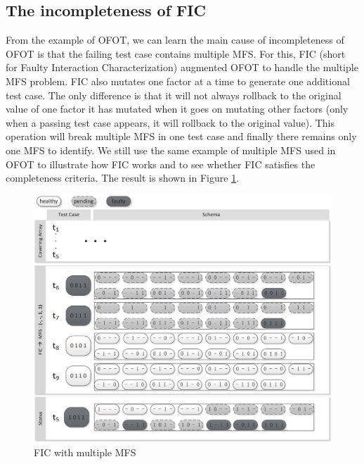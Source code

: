 \subsection{The incompleteness of FIC}

From the example of OFOT, we can learn the main cause of incompleteness of OFOT is that the failing test case contains multiple MFS. For this, FIC \cite{zhang2011characterizing} (short for Faulty Interaction Characterization) augmented OFOT to handle the multiple MFS problem.
FIC also mutates one factor at a time to generate one additional test case.  The only difference is that it will not always rollback to the original value of one factor it has mutated when it goes on mutating other factors (only when a passing test case appears, it will rollback to the original value). This operation will break multiple MFS in one test case and finally there remains only one MFS to identify. We still use the same example of multiple MFS used in OFOT to illustrate how FIC works and to see whether FIC satisfies the completeness criteria. The result is shown in Figure \ref{fig_fic_multi}.

\begin{figure}[!htb]
 \centering
 \includegraphics[width=5.3in]{fic.pdf}
 \caption{FIC with multiple MFS}
 \label{fig_fic_multi}
\end{figure}

